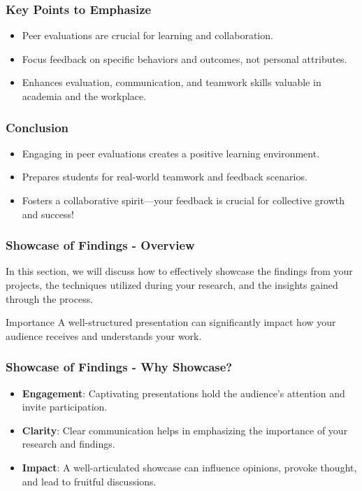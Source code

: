 \documentclass[aspectratio=169]{beamer}
\begin{document}
\begin{frame}[fragile]
    \frametitle{Key Points to Emphasize}
    \begin{itemize}
        \item Peer evaluations are crucial for learning and collaboration.
        \item Focus feedback on specific behaviors and outcomes, not personal attributes.
        \item Enhances evaluation, communication, and teamwork skills valuable in academia and the workplace.
    \end{itemize}
\end{frame}

\begin{frame}[fragile]
    \frametitle{Conclusion}
    \begin{itemize}
        \item Engaging in peer evaluations creates a positive learning environment.
        \item Prepares students for real-world teamwork and feedback scenarios.
        \item Fosters a collaborative spirit—your feedback is crucial for collective growth and success!
    \end{itemize}
\end{frame}

\begin{frame}[fragile]
    \frametitle{Showcase of Findings - Overview}
    In this section, we will discuss how to effectively showcase the findings from your projects, the techniques utilized during your research, and the insights gained through the process. 
    \begin{block}{Importance}
        A well-structured presentation can significantly impact how your audience receives and understands your work.
    \end{block}
\end{frame}

\begin{frame}[fragile]
    \frametitle{Showcase of Findings - Why Showcase?}
    \begin{itemize}
        \item \textbf{Engagement}: Captivating presentations hold the audience's attention and invite participation.
        \item \textbf{Clarity}: Clear communication helps in emphasizing the importance of your research and findings.
        \item \textbf{Impact}: A well-articulated showcase can influence opinions, provoke thought, and lead to fruitful discussions.
    \end{itemize}
\end{frame}
\end{document}
